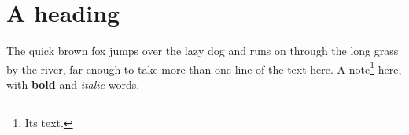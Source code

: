 \documentclass{article}
\begin{document}
\section{A heading}
The quick brown fox jumps over the lazy dog and runs on through the long grass by the river, far enough to take more than one line of the text here. A note\footnote{Its text.} here, with \textbf{bold} and \textit{italic} words.
\end{document}
